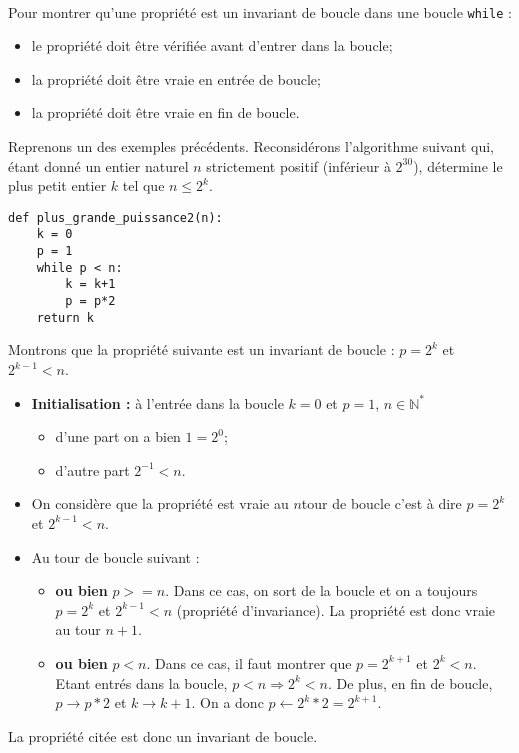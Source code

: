 \begin{methode}~\\
Pour montrer qu'une propriété est un invariant de boucle dans une boucle \texttt{while} :
\begin{itemize}
\item le propriété doit être vérifiée avant d'entrer dans la boucle;
\item la propriété doit être vraie en entrée de boucle;
\item la propriété doit être vraie en fin de boucle.
\end{itemize}
\end{methode}
%


Reprenons un des exemples précédents. Reconsidérons l’algorithme suivant qui, étant donné un entier naturel $n$ strictement positif (inférieur à $2^{30}$), détermine le plus petit entier $k$ tel que $n \leq 2^k$.
\begin{lstlisting}
def plus_grande_puissance2(n):
    k = 0
    p = 1
    while p < n:
        k = k+1
        p = p*2
    return k
\end{lstlisting}

Montrons que la propriété suivante est un invariant de boucle : $p=2^k$ et $2^{k-1}<n$.
\begin{itemize}
\item \textbf{Initialisation : }à l'entrée dans la boucle $k=0$ et $p=1$, $n\in\mathbb{N}^*$
\begin{itemize}
\item d'une part  on a bien $1=2^0$;
\item d'autre part $2^{-1}<n$.
\end{itemize}
\item On considère que la propriété est vraie au $n$\ieme tour de boucle c'est à dire $p=2^k$ et $2^{k-1}<n$.
\item Au tour de boucle suivant : 
\begin{itemize}
\item \textbf{ou bien} $p>=n$. Dans ce cas, on sort de la boucle et on a toujours $p=2^k$ et $2^{k-1}<n$ (propriété d'invariance). La propriété est donc vraie au tour $n+1$.
\item \textbf{ou bien} $p<n$. Dans ce cas, il faut montrer que  $p=2^{k+1}$ et $2^{k}<n$. Etant entrés dans la boucle, $p<n \Rightarrow 2^k<n$. De plus, en fin de boucle, $p\rightarrow p *2$ et $k\rightarrow k+1$. On a donc $p\leftarrow 2^k *2=2^{k+1}$. 
\end{itemize}
\end{itemize}
La propriété citée est donc un invariant de boucle. 

